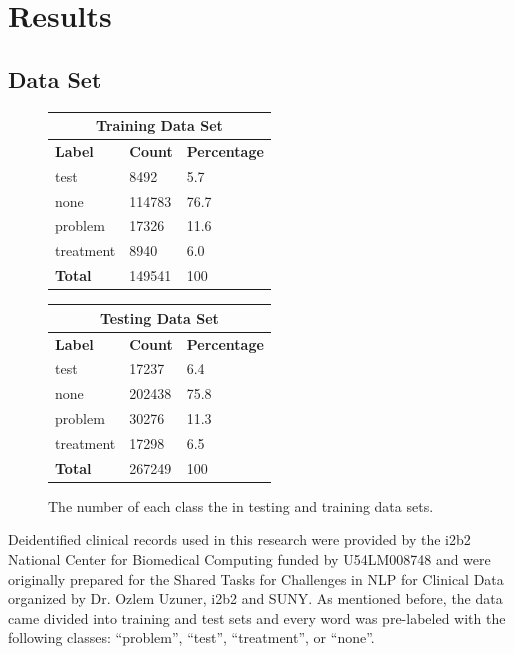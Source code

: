 \documentclass[preprint]{style}
\begin{document}
\section{Results}

\subsection{Data Set}

\begin{figure}[t]
\begin{center}
\begin{center}
	\begin{tabular}{|l|l|l|}
	\hline
	\multicolumn{3}{|c|}{\bf Training Data Set} \\ \hline
	{\bf Label} & {\bf Count} & {\bf Percentage} \\ \hline
	test & 8492 & 5.7\\ \hline
	none & 114783 & 76.7\\ \hline
	 problem & 17326 & 11.6\\ \hline
	 treatment & 8940 & 6.0\\ \hline
	 {\bf Total} & 149541 & 100\\ \hline
	\end{tabular}
\end{center}

\begin{center}
	\begin{tabular}{|l|l|l|}
	\hline
	\multicolumn{3}{|c|}{\bf Testing Data Set} \\ \hline
	{\bf Label} & {\bf Count} & {\bf Percentage} \\ \hline
	test & 17237 & 6.4\\ \hline
	none & 202438 & 75.8\\ \hline
	 problem & 30276 & 11.3\\ \hline
	 treatment & 17298 & 6.5\\ \hline
	 {\bf Total} & 267249 & 100\\ \hline
	\end{tabular}
\end{center}
\end{center}
\caption{The number of each class the in testing and training data sets.}
\label{fig:data_set_counts}
\end{figure}


Deidentified clinical records used in this research were provided by the i2b2 National Center for Biomedical Computing funded by U54LM008748 and were originally prepared for the Shared Tasks for Challenges in NLP for Clinical Data organized by Dr. Ozlem Uzuner, i2b2 and SUNY. As mentioned before, the data came divided into training and test sets and every word was pre-labeled with the following classes: ``problem'', ``test'', ``treatment'', or ``none''. 
\end{document}
